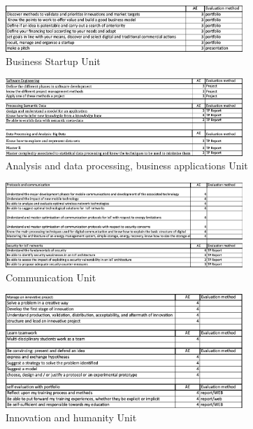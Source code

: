 \begin{figure}[!ht]
    \centering
    \includegraphics[width=0.8\textwidth]{image/Business startup.png}
    \caption{Business Startup Unit}
    \label{fig:Business Startup Unit}
\end{figure}
\begin{figure}[!ht]
    \centering
    \includegraphics[width=0.8\textwidth]{image/Analysis and data processing, business applications.png}
    \caption{Analysis and data processing, business applications Unit}
    \label{fig:Analysis and data processing, business applications}
\end{figure}
\begin{figure}[!ht]
    \centering
    \includegraphics[width=0.8\textwidth]{image/Communication.png}
    \caption{Communication Unit}
    \label{fig:Communication}
\end{figure}
\begin{figure}[!ht]
    \centering
    \includegraphics[width=0.8\textwidth]{image/Innovation and humanity.png}
    \caption{Innovation and humanity Unit}
    \label{fig:Innovation and humanity}
\end{figure}
